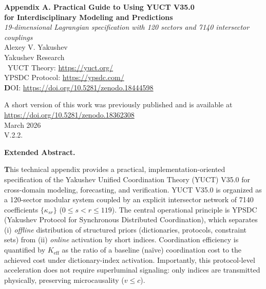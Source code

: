 \documentclass[13pt,a4paper]{article}
\newcommand{\Keff}{K_{\mathrm{eff}}}
\begin{document}
	
	\begin{titlepage}
		\begin{center}
			\vspace*{0.2cm}
			{\Huge\textbf{Appendix A. 
					Practical Guide to Using YUCT V35.0\\
					for Interdisciplinary Modeling and Predictions}}\\[0.8cm]
			
			{\Large\textit{19-dimensional Lagrangian specification with 120 sectors and 7140 intersector couplings}}\\[1.2cm]
			
			{\Large Alexey V. Yakushev}\\[0.3cm]
			{\large Yakushev Research}\\\
	YUCT Theory: \url{https://yuct.org/}\\
YPSDC Protocol: \url{https://ypsdc.com/}\\


\vspace{2cm}
\textbf DOI: \url{https://doi.org/10.5281/zenodo.18444598}\\

\vspace{1cm}

\vspace{0cm}
\large 
A short version of this work was previously published and is available at\\ \url{https://doi.org/10.5281/zenodo.18362308}\\
\vspace{1cm}
March 2026 \\ \large V.2.2.
			
			\begin{minipage}{0.92\textwidth}
				\begin{center}\large\textbf{Extended Abstract.} \\
				\end{center}
				\large\textbf This technical appendix provides a practical, implementation-oriented specification of the Yakushev Unified Coordination Theory (YUCT) V35.0 for cross-domain modeling, forecasting, and verification. YUCT V35.0 is organized as a 120-sector modular system coupled by an explicit intersector network of 7140 coefficients $\{\kappa_{sr}\}$ ($0\le s<r\le 119$). The central operational principle is YPSDC (Yakushev Protocol for Synchronous Distributed Coordination), which separates (i) \emph{offline} distribution of structured priors (dictionaries, protocols, constraint sets) from (ii) \emph{online} activation by short indices. Coordination efficiency is quantified by $\Keff$ as the ratio of a baseline (na\"ive) coordination cost to the achieved cost under dictionary-index activation. Importantly, this protocol-level acceleration does not require superluminal signaling: only indices are transmitted physically, preserving microcausality ($v\le c$).
				

\end{minipage}
\end{center}
\end{titlepage}
\end{document}
